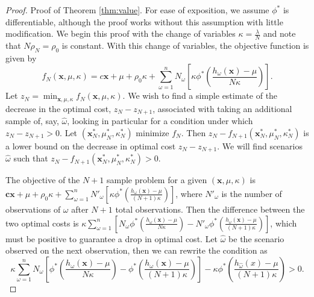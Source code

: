 \documentclass[opre,nonblindrev]{informs3} %
\newcommand{\x}{\mathbf{x}}
\renewcommand{\c}{\mathbf{c}}
\begin{document}
\begin{proof}{\sc Proof of Theorem \ref{thm:value}.}
	For ease of exposition, we assume $\phi^*$ is differentiable, although the proof works without this assumption with little modification.	
	We begin this proof with the change of variables $\kappa = \frac{\lambda}{N}$ and note that $N\rho_N = \rho_0$ is constant.	
	With this change of variables, the objective function is given by
	\[
		f_N(\x,\mu,\kappa) = c\x + \mu + \rho_0 \kappa + \sum_{\omega = 1}^n N_\omega \left[ \kappa \phi^*\left(\frac{h_\omega(\x) - \mu}{N\kappa} \right) \right].
	\]
	Let $z_N = \min_{\x,\mu,\kappa} f_N(\x,\mu,\kappa)$.
	We wish to find a simple estimate of the decrease in the optimal cost, $z_N - z_{N+1}$, associated with taking an additional sample of, say, $\hat{\omega}$, looking in particular for a condition under which $z_N - z_{N+1} > 0$.	
	Let $(\x^*_N,\mu^*_N,\kappa^*_N)$ minimize $f_N$.
	Then $z_N - f_{N+1}(\x^*_N,\mu^*_N,\kappa^*_N)$ is a lower bound on the decrease in optimal cost $z_N - z_{N+1}$.
	We will find scenarios $\hat{\omega}$ such that $z_N - f_{N+1}(\x^*_N,\mu^*_N,\kappa^*_N) > 0$.

	The objective of the $N+1$ sample problem for a given $(\x,\mu,\kappa)$ is $\c\x + \mu + \rho_0 \kappa + \sum_{\omega = 1}^n N'_\omega \left[ \kappa \phi^*\left(\frac{h_\omega(\x) - \mu}{(N+1)\kappa} \right) \right]$,	where $N'_\omega$ is the number of observations of $\omega$ after $N+1$ total observations.
	Then the difference between the two optimal costs is $\kappa \sum_{\omega=1}^n \left[ N_\omega \phi^*\left(\frac{h_\omega(\x) - \mu}{N\kappa} \right) - N'_\omega \phi^*\left(\frac{h_\omega(\x) - \mu}{(N+1)\kappa} \right) \right]$, which must be positive to guarantee a drop in optimal cost.
	Let $\hat{\omega}$ be the scenario observed on the next observation, then we can rewrite the condition as
	\begin{equation} \label{eq:raw_cond}
		\kappa \sum_{\omega=1}^n N_\omega \left[ \phi^*\left(\frac{h_\omega(\x) - \mu}{N\kappa} \right) - \phi^*\left(\frac{h_\omega(\x) - \mu}{(N+1)\kappa} \right) \right] - \kappa \phi^*\left(\frac{h_{\hat{\omega}}(x) - \mu}{(N+1)\kappa}\right) > 0.
	\end{equation}


\end{proof}
\end{document}
